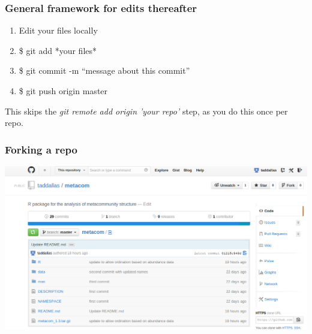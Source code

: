 \documentclass{beamer}\usepackage{graphicx, color}
\begin{document}
\begin{frame}
 \frametitle{General framework for edits thereafter}
\begin{block}{}
 \begin{enumerate}
  \item Edit your files locally
  \item \$ git add *your files*
  \item \$ git commit -m ``message about this commit''
  \item \$ git push origin master 
 \end{enumerate}
\end{block}
This skips the \textit{git remote add origin 'your repo'} step, as you do this once per repo. 
\end{frame}



\begin{frame}
 \frametitle{Forking a repo}
 \includegraphics[width=\textwidth]{fork.png}\\
\end{frame}
\end{document}
